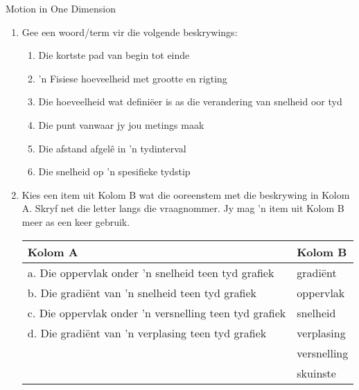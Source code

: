 \begin{eocexercises}{Motion in One Dimension}
\nopagebreak \noindent
    \begin{enumerate}[noitemsep, label=\textbf{\arabic*}. ] 
    \item Gee een woord/term vir die volgende beskrywings:
    \begin{enumerate}[noitemsep, label=\textbf{\alph*}. ] 
        \item Die kortste pad van begin tot einde
        \item 'n Fisiese hoeveelheid met grootte en rigting
        \item Die hoeveelheid wat defini\"eer is as die verandering van snelheid oor tyd
        \item Die punt vanwaar jy jou metings maak
        \item Die afstand afgel\^e in 'n tydinterval
        \item Die snelheid op 'n spesifieke tydstip
    \end{enumerate}
    \item Kies een item uit Kolom B wat die ooreenstem met die beskrywing in Kolom A. Skryf net die letter langs die vraagnommer. Jy mag 'n item uit Kolom B meer as een keer gebruik.
              \begin{table}[H]
            \begin{center}
          \label{m38796*uid180}
        \noindent
          \begin{tabular}{|l|l|}\hline
            Kolom A &
            Kolom B \\ \hline
            a. Die oppervlak onder 'n snelheid teen tyd grafiek &
            gradi\"ent \\ \hline
            b. Die gradi\"ent van 'n snelheid teen tyd grafiek &
            oppervlak\\ \hline
            c. Die oppervlak onder 'n versnelling teen tyd grafiek &
            snelheid\\ \hline
            d. Die gradi\"ent van 'n verplasing teen tyd grafiek &
            verplasing \\ \hline
             &
            versnelling\\ \hline
             &
            skuinste \\ \hline
        \end{tabular}
          \end{center}
    \end{table}
        \par
    

\end{enumerate}
\end{eocexercises}
